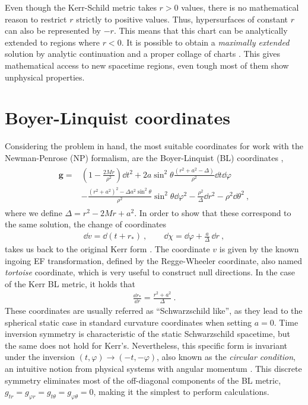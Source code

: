 Even though the Kerr-Schild metric takes $r>0$ values, there is no mathematical reason to restrict $r$ strictly to positive values.
Thus, hypersurfaces of constant $r$ can also be represented by $-r$. 
This means that this chart can be analytically extended to regions where $r<0$.
It is possible to obtain a \emph{maximally extended} solution by analytic continuation and a proper collage of charts \cite{Townsend1997}.
This gives mathematical access to new spacetime regions, even tough most of them show unphysical properties.


\section{Boyer-Linquist coordinates}

Considering the problem in hand, the most suitable coordinates for work with the Newman-Penrose (NP) formalism, are the Boyer-Linquist (BL) coordinates \cite{Boyer1967},
\begin{align}
    \label{eq2:KerrBL}
    \begin{split}
        \bm{g} = & \left(1 - \frac{2 M r}{\rho^2} \right) \dd t^2 + 2 a \sin^2\theta \frac{(r^2+a^2-\Delta)}{\rho^2} \dd t \dd \varphi \\
        &- \frac{(r^2+a^2)^2- \Delta a^2 \sin^2\theta}{\rho^2} \sin^2\theta \dd\varphi^2 - \frac{\rho^2}{\Delta} \dd r^2 - \rho^2 \dd \theta^2 ~,
    \end{split}
\end{align}
where we define $\Delta=r^2-2 M r + a^2$.
In order to show that these correspond to the same solution, the change of coordinates
\begin{align}
    \label{eq2:InEFtoBL}
    \dd v = \dd ( t + r_* ) ~, \qquad \dd \chi = \dd \varphi + \frac{a}{\Delta} \,\dd r ~,
\end{align}
takes us back to the original Kerr form .
The coordinate $v$ is given by the known ingoing EF transformation, defined by the Regge-Wheeler coordinate, also named \emph{tortoise} coordinate, which is very useful to construct null directions.
In the case of the Kerr BL metric, it holds that
\begin{align}
    \label{eq2:tortoise}
    \frac{\dd r_*}{\dd r} = \frac{r^2+a^2}{\Delta} ~.
\end{align}
These coordinates are usually referred as ``Schwarzschild like'', as they lead to the spherical static case in standard curvature coordinates when setting $a=0$. 
Time inversion symmetry is characteristic of the static Schwarzschild spacetime, but the same does not hold for Kerr's.
Nevertheless, this specific form is invariant under the inversion $(t,\varphi)\to(-t,-\varphi)$, also known as the \emph{circular condition}, an intuitive notion from physical systems with angular momentum \cite{Wald2010, Heusler1996}.
This discrete symmetry eliminates most of the off-diagonal components of the BL metric, $g_{tr} = g_{\varphi r} = g_{t \theta} = g_{\varphi \theta} = 0$, making it the simplest to perform calculations.

